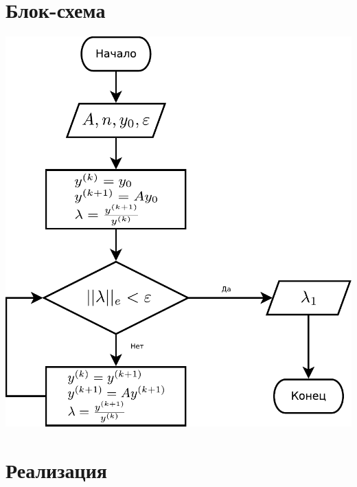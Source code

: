 \documentclass[a4paper,11pt]{article}
\begin{document}
\part*{Блок-схема} 
\includegraphics[scale=1]{flowchart.pdf}
 


\newpage
\part*{Реализация}



 
 

 
 \newpage
\end{document}
